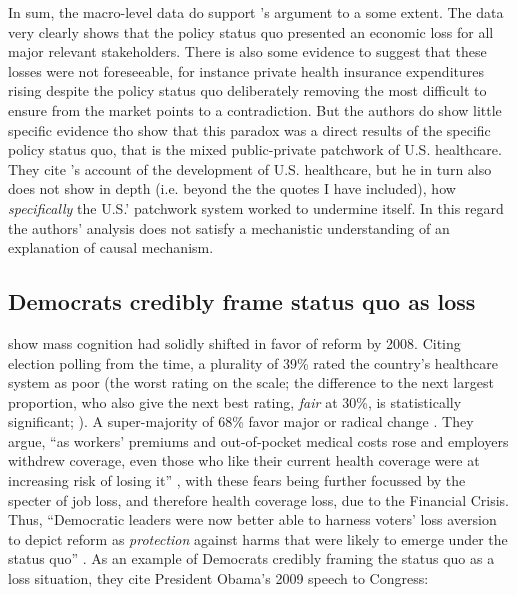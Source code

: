 \documentclass[11pt]{article}
\begin{document}
In sum, the macro-level data do support \citeauthor{Jacobs2014}'s \parencite*{Jacobs2014} argument to a some extent. The data very clearly shows that the policy status quo presented an economic loss for all major relevant stakeholders. There is also some evidence to suggest that these losses were not foreseeable, for instance private health insurance expenditures rising despite the policy status quo deliberately removing the most difficult to ensure from the market points to a contradiction. But the authors do show little specific evidence tho show that this paradox was a direct results of the specific policy status quo, that is the mixed public-private patchwork of U.S. healthcare. They cite \citeauthor[][]{Hacker1998}'s \parencite*{Hacker1998} account of the development of U.S. healthcare, but he in turn also does not show in depth (i.e. beyond the the quotes I have included), how \textit{specifically} the U.S.' patchwork system worked to undermine itself. In this regard the authors' analysis does not satisfy a mechanistic understanding of an explanation of causal mechanism.

\subsection*{Democrats credibly frame status quo as loss}

\textcite[][]{Jacobs2014} show mass cognition had solidly shifted in favor of reform by 2008. Citing election polling from the time, a plurality of 39\% rated the country's healthcare system as poor (the worst rating on the scale; the difference to the next largest proportion, who also give the next best rating, \textit{fair} at 30\%, is statistically significant; ). A super-majority of 68\% favor major or radical change \parencite[][p. 2058]{Blendon2008}. They argue, \enquote{as workers' premiums and out-of-pocket medical costs rose and employers withdrew coverage, even those who like their current health coverage were at increasing risk of losing it} , with these fears being further focussed by the specter of job loss, and therefore health coverage loss, due to the Financial Crisis. Thus, \enquote{Democratic leaders were now better able to harness voters' loss aversion to depict reform as \textit{protection} against harms that were likely to emerge under the status quo} . As an example of Democrats credibly framing the status quo as a loss situation, they cite President Obama's 2009 speech to Congress:
\end{document}
